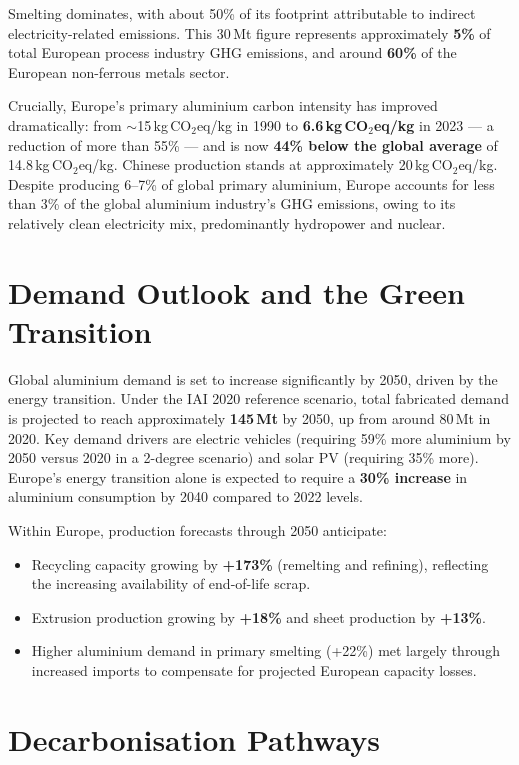 Smelting dominates, with about 50\% of its footprint attributable to indirect electricity-related
emissions. This 30\,Mt figure represents approximately \textbf{5\%} of total European process
industry GHG emissions, and around \textbf{60\%} of the European non-ferrous metals sector.

Crucially, Europe's primary aluminium carbon intensity has improved dramatically: from
$\sim$15\,kg\,CO$_2$eq/kg in 1990 to \textbf{6.6\,kg\,CO$_2$eq/kg} in 2023 — a reduction of
more than 55\% — and is now \textbf{44\% below the global average} of 14.8\,kg\,CO$_2$eq/kg.
Chinese production stands at approximately 20\,kg\,CO$_2$eq/kg. Despite producing 6--7\% of
global primary aluminium, Europe accounts for less than 3\% of the global aluminium industry's
GHG emissions, owing to its relatively clean electricity mix, predominantly hydropower and
nuclear.

\section{Demand Outlook and the Green Transition}

Global aluminium demand is set to increase significantly by 2050, driven by the energy transition.
Under the IAI 2020 reference scenario, total fabricated demand is projected to reach approximately
\textbf{145\,Mt} by 2050, up from around 80\,Mt in 2020. Key demand drivers are electric vehicles
(requiring 59\% more aluminium by 2050 versus 2020 in a 2-degree scenario) and solar PV
(requiring 35\% more). Europe's energy transition alone is expected to require a \textbf{30\%
increase} in aluminium consumption by 2040 compared to 2022 levels.

Within Europe, production forecasts through 2050 anticipate:

\begin{itemize}
    \item Recycling capacity growing by \textbf{+173\%} (remelting and refining), reflecting the
          increasing availability of end-of-life scrap.
    \item Extrusion production growing by \textbf{+18\%} and sheet production by \textbf{+13\%}.
    \item Higher aluminium demand in primary smelting (+22\%) met largely through increased
          imports to compensate for projected European capacity losses.
\end{itemize}

\section{Decarbonisation Pathways}

